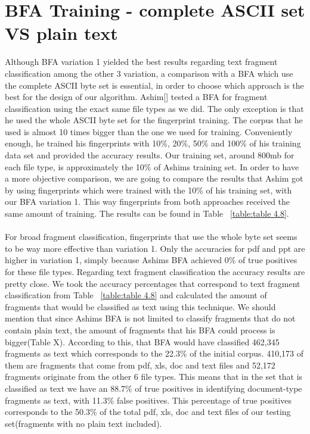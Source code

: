 \section{BFA Training - complete ASCII set VS plain text }
Although BFA variation 1 yielded the best results regarding text fragment classification among the other 3 variation, a comparison with a BFA which use the complete ASCII byte set is essential, in order to choose which approach is the best for the design of our algorithm. Ashim[] tested a BFA for fragment classification using the exact same file types as we did. The only exception is that he used the whole ASCII byte set for the fingerprint training. The corpus that he used is almost 10 times bigger than the one we used for training. Conveniently enough, he trained his fingerprints with 10\%, 20\%, 50\% and 100\% of his training data set and provided the accuracy results. Our training set, around 800mb for each file type, is approximately the 10\% of Ashims training set. In order to have a more objective comparison, we are going to compare the results that Ashim got by using fingerprints which were trained with the 10\% of his training set, with our BFA variation 1. This way fingerprints from both approaches received the same amount of training. The results can be found in Table ~\ref{table:table 4.8}.\\\\ 
  
 For broad fragment classification, fingerprints that use the whole byte set seems to be way more effective than variation 1. Only the accuracies for pdf and ppt are higher in variation 1, simply because Ashims BFA achieved 0\% of true positives for these file types. Regarding text fragment classification the accuracy results are pretty close. We took the accuracy percentages that correspond to text fragment classification from Table ~\ref{table:table 4.8} and calculated the amount of fragments that would be classified as text using this technique. We should mention that since Ashims BFA is not limited to classify fragments that do not contain plain text, the amount of fragments that his BFA could process is bigger(Table X). According to this, that BFA would have classified 462,345 fragments as text which corresponds to the 22.3\% of the initial corpus. 410,173 of them are fragments that come from pdf, xls, doc and text files and 52,172 fragments originate from the other 6 file types. This means that in the set that is classified as text we have an 88.7\% of true positives in identifying document-type fragments as text, with 11.3\% false positives. This percentage of true positives corresponds to the 50.3\% of the total pdf, xls, doc and text files of our testing set(fragments with no plain text included).\\\\
 
